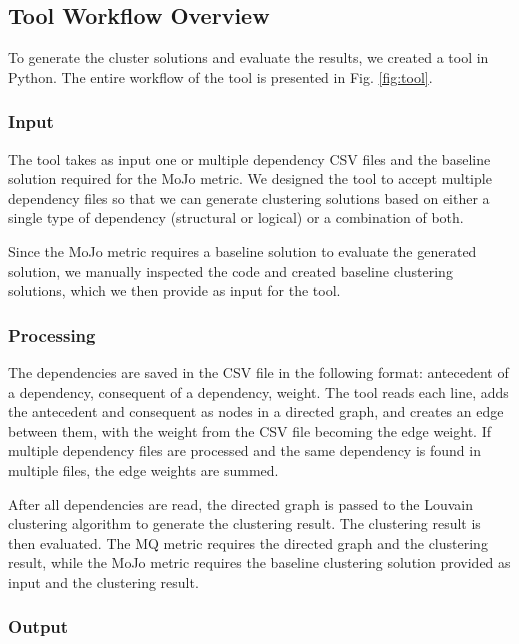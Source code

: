 \documentclass{ieeeaccess}
\begin{document}
\subsection{Tool Workflow Overview}
\label{subsec:tool_workflow}

To generate the cluster solutions and evaluate the results, we created a tool in Python. The entire workflow of the tool is presented in Fig. \ref{fig:tool}.

\subsubsection{Input}

The tool takes as input one or multiple dependency CSV files and the baseline solution required for the MoJo metric. We designed the tool to accept multiple dependency files so that we can generate clustering solutions based on either a single type of dependency (structural or logical) or a combination of both.

Since the MoJo metric requires a baseline solution to evaluate the generated solution, we manually inspected the code and created baseline clustering solutions, which we then provide as input for the tool.

\subsubsection{Processing}

The dependencies are saved in the CSV file in the following format: antecedent of a dependency, consequent of a dependency, weight. The tool reads each line, adds the antecedent and consequent as nodes in a directed graph, and creates an edge between them, with the weight from the CSV file becoming the edge weight. If multiple dependency files are processed and the same dependency is found in multiple files, the edge weights are summed.


After all dependencies are read, the directed graph is passed to the Louvain clustering algorithm to generate the clustering result. The clustering result is then evaluated. The MQ metric requires the directed graph and the clustering result, while the MoJo metric requires the baseline clustering solution provided as input and the clustering result.

\subsubsection{Output}
\end{document}
